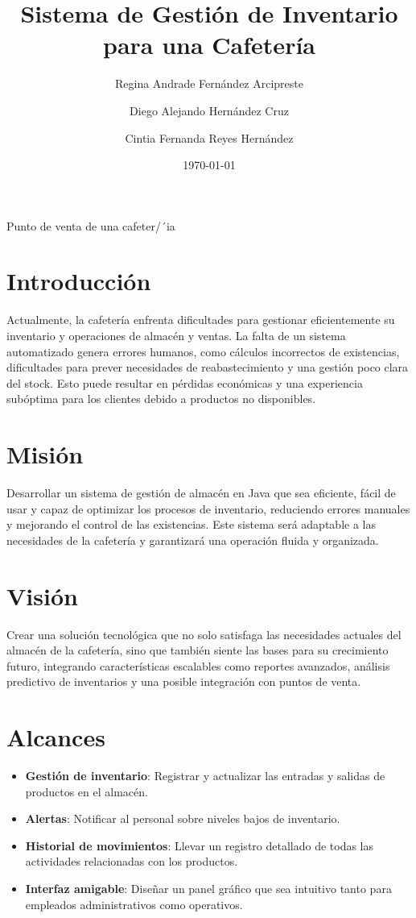 \documentclass{article}
\title{Sistema de Gestión de Inventario para una Cafetería}
\author{Regina Andrade Fernández Arcipreste \and Diego Alejando Hernández Cruz \and Cintia Fernanda Reyes Hernández  }
\date{\today}
\begin{document}
\begin{center}

Punto de venta de una cafeter/´ia

\end{center}



\section{Introducción}
Actualmente, la cafetería enfrenta dificultades para gestionar eficientemente su inventario y operaciones de almacén y ventas. La falta de un sistema automatizado genera errores humanos, como cálculos incorrectos de existencias, dificultades para prever necesidades de reabastecimiento y una gestión poco clara del stock. Esto puede resultar en pérdidas económicas y una experiencia subóptima para los clientes debido a productos no disponibles.

\section{Misión}
Desarrollar un sistema de gestión de almacén en Java que sea eficiente, fácil de usar y capaz de optimizar los procesos de inventario, reduciendo errores manuales y mejorando el control de las existencias. Este sistema será adaptable a las necesidades de la cafetería y garantizará una operación fluida y organizada.

\section{Visión}
Crear una solución tecnológica que no solo satisfaga las necesidades actuales del almacén de la cafetería, sino que también siente las bases para su crecimiento futuro, integrando características escalables como reportes avanzados, análisis predictivo de inventarios y una posible integración con puntos de venta.

\section{Alcances}
\begin{itemize}
\item \textbf{Gestión de inventario}: Registrar y actualizar las entradas y salidas de productos en el almacén.
\item \textbf{Alertas}: Notificar al personal sobre niveles bajos de inventario.
\item \textbf{Historial de movimientos}: Llevar un registro detallado de todas las actividades relacionadas con los productos.
\item \textbf{Interfaz amigable}: Diseñar un panel gráfico que sea intuitivo tanto para empleados administrativos como operativos.
\end{itemize}
\end{document}
